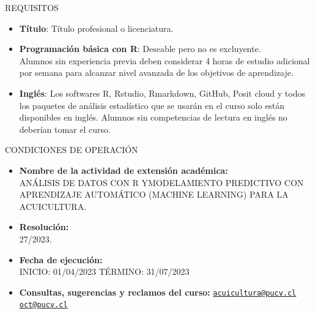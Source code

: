 \documentclass[
  ignorenonframetext,
]{beamer}
\begin{document}
\begin{frame}{REQUISITOS}
\protect\hypertarget{requisitos}{}

\begin{itemize}
\item
  \textbf{Título}: Título profesional o licenciatura.
\item
  \textbf{Programación básica con R}: Deseable pero no es excluyente.\\
  Alumnos sin experiencia previa deben considerar 4 horas de estudio
  adicional por semana para alcanzar nivel avanzada de los objetivos de
  aprendizaje.
\item
  \textbf{Inglés}: Los softwares R, Rstudio, Rmarkdown, GitHub, Posit
  cloud y todos los paquetes de análisis estadístico que se usarán en el
  curso solo están disponibles en inglés. Alumnos sin competencias de
  lectura en inglés no deberían tomar el curso.
\end{itemize}

\end{frame}

\begin{frame}{CONDICIONES DE OPERACIÓN}
\protect\hypertarget{condiciones-de-operaciuxf3n}{}

\begin{itemize}
\item
  \textbf{Nombre de la actividad de extensión académica:}\\
  ANÁLISIS DE DATOS CON R YMODELAMIENTO PREDICTIVO CON APRENDIZAJE
  AUTOMÁTICO (MACHINE LEARNING) PARA LA ACUICULTURA.
\item
  \textbf{Resolución:}\\
  27/2023.
\item
  \textbf{Fecha de ejecución:}\\
  INICIO: 01/04/2023 TÉRMINO: 31/07/2023
\item
  \textbf{Consultas, sugerencias y reclamos del curso:}
  \href{mailto:acuicultura@pucv.cl}{\nolinkurl{acuicultura@pucv.cl}}\\
  \href{mailto:oct@pucv.cl}{\nolinkurl{oct@pucv.cl}}
\end{itemize}

\end{frame}
\end{document}
